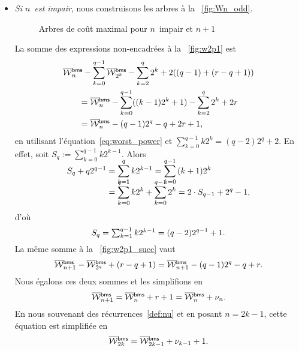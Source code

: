 \begin{itemize}
  \item \emph{Si \(n\)~est impair}, nous construisons les arbres à la
    \fig~\vref{fig:Wn_odd}.
\begin{figure}[t]
\centering
{}
\qquad
{} %
\caption{Arbres de coût maximal pour \(n\)~impair et \(n+1\)}
\label{fig:Wn_odd}
\end{figure}
    La somme des expressions non-encadrées à la \fig~\ref{fig:w2p1} est
    \begin{multline*}
      \OW{\fun{bms}}{n} - \sum_{k=0}^{q-1}\OW{\fun{bms}}{2^k} -
      \sum_{k=2}^{q}2^k + 2((q-1)+(r-q+1))\\
      \begin{aligned}
        & = \OW{\fun{bms}}{n} - \sum_{k=0}^{q-1}((k-1)2^{k}+1)
        - \sum_{k=2}^{q}2^k + 2r\\
        & = \OW{\fun{bms}}{n} - (q-1)2^q - q + 2r + 1,
      \end{aligned}
    \end{multline*}
    en utilisant l'équation~\eqref{eq:worst_power} et
    \(\sum_{k=0}^{q-1}k2^k = (q-2)2^{q}+2\). En effet, soit \(S_{q} :=
    \sum_{k=0}^{q-1}{k2^{k-1}}\). Alors
    \begin{align*}
      S_{q} + q2^{q-1} & = \smash[t]{\sum_{k=1}^{q}{k2^{k-1}}}
      = \smash[t]{\sum_{k=0}^{q-1}{(k+1)2^{k}}} \\
      & = \smash[t]{\sum_{k=0}^{q-1}{k2^{k}}} + \smash[t]{\sum_{k=0}^{q-1}{2^{k}}}
      = 2 \cdot S_{q-1} + 2^{q} - 1,
    \end{align*}
    d'où
    \begin{equation}
      \abovedisplayskip=4pt
      \belowdisplayskip=4pt
      S_{q} = \smash[t]{\textstyle\sum_{k=1}^{q-1}{k2^{k-1}}} =
      (q-2)2^{q-1} + 1.
      \label{eq:Sj}
    \end{equation}
    La même somme à la \fig~\ref{fig:w2p1_succ}
    vaut
    \begin{equation*}
      \OW{\fun{bms}}{n+1} - \OW{\fun{bms}}{2^q} + (r-q+1) =
      \OW{\fun{bms}}{n+1} - (q-1)2^{q} - q + r.
    \end{equation*}
    Nous égalons ces deux sommes et les simplifions en
    \begin{equation*}
      \OW{\fun{bms}}{n+1} = \OW{\fun{bms}}{n} + r + 1=
      \OW{\fun{bms}}{n} + \nu_n.
    \end{equation*}
    En nous souvenant des récurrences~\eqref{def:nu}  et
    en posant \(n=2k-1\), cette équation est simplifiée en
    \begin{equation}
      \OW{\fun{bms}}{2k} = \OW{\fun{bms}}{2k-1} + \nu_{k-1} + 1.
      \label{eq:OWbms_2k}
    \end{equation}

\end{itemize}
